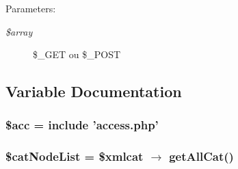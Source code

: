 \begin{Desc}
\item[Parameters:]
\begin{description}
\item[{\em \$array}]\$\_\-GET ou \$\_\-POST \end{description}
\end{Desc}


\subsection{Variable Documentation}
\subsubsection{\setlength{\rightskip}{0pt plus 5cm}\$acc = include 'access.php'}\label{modifpersoattrb_8php_542926c588a05eb69553d79c83cf73da}


\subsubsection{\setlength{\rightskip}{0pt plus 5cm}\$cat\-Node\-List = \$xmlcat $\rightarrow$ get\-All\-Cat()}\label{modifpersoattrb_8php_78eb3ad49aeb7f099c7d383eac508d20}


